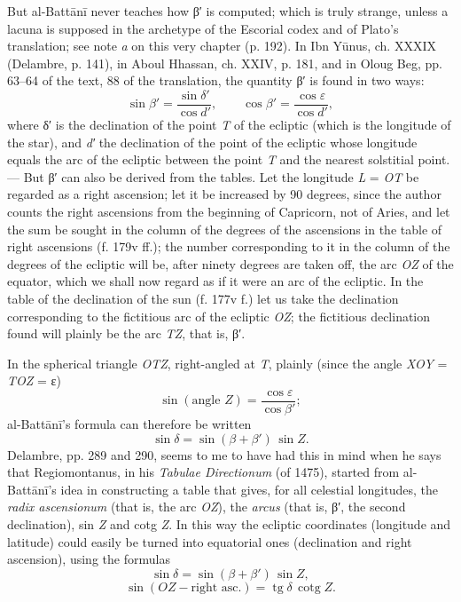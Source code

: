 \documentclass[11pt]{article}
\begin{document}
\par But al-Battānī never teaches how {\greekfont β}′ is computed; which is truly strange, unless a lacuna is supposed in the archetype of the Escorial codex and of Plato's translation; see note \emph{a} on this very chapter (p. 192). In Ibn Yūnus, ch. XXXIX (Delambre, p. 141), in Aboul Hhassan, ch. XXIV, p. 181, and in Oloug Beg, pp. 63–64 of the text, 88 of the translation, the quantity {\greekfont β}′ is found in two ways: \[ \sin\beta' = \frac{\sin\delta'}{\cos d'}, \qquad \cos\beta' = \frac{\cos\varepsilon}{\cos d'}, \] where {\greekfont δ}′ is the declination of the point \emph{T} of the ecliptic (which is the longitude of the star), and \emph{d′} the declination of the point of the ecliptic whose longitude equals the arc of the ecliptic between the point \emph{T} and the nearest solstitial point. — But {\greekfont β}′ can also be derived from the tables. Let the longitude \emph{L} = \emph{OT} be regarded as a right ascension; let it be increased by 90 degrees, since the author counts the right ascensions from the beginning of Capricorn, not of Aries, and let the sum be sought in the column of the degrees of the ascensions in the table of right ascensions (f. 179v ff.); the number corresponding to it in the column of the degrees of the ecliptic will be, after ninety degrees are taken off, the arc \emph{OZ} of the equator, which we shall now regard as if it were an arc of the ecliptic. In the table of the declination of the sun (f. 177v f.) let us take the declination corresponding to the fictitious arc of the ecliptic \emph{OZ}; the fictitious declination found will plainly be the arc \emph{TZ}, that is, {\greekfont β}′.\par
\par In the spherical triangle \emph{OTZ}, right-angled at \emph{T}, plainly (since the angle \emph{XOY} = \emph{TOZ} = {\greekfont ε}) \[ \sin(\text{angle } Z) = \frac{\cos\varepsilon}{\cos\beta'}; \] al-Battānī's formula can therefore be written \[ \sin\delta = \sin(\beta + \beta')\,\sin Z. \] Delambre, pp. 289 and 290, seems to me to have had this in mind when he says that Regiomontanus, in his \emph{Tabulae Directionum} (of 1475), started from al-Battānī's idea in constructing a table that gives, for all celestial longitudes, the \emph{radix ascensionum} (that is, the arc \emph{OZ}), the \emph{arcus} (that is, {\greekfont β}′, the second declination), sin \emph{Z} and cotg \emph{Z}. In this way the ecliptic coordinates (longitude and latitude) could easily be turned into equatorial ones (declination and right ascension), using the formulas \[ \sin\delta = \sin(\beta + \beta')\,\sin Z, \] \[ \sin(OZ - \text{right asc.}) = \operatorname{tg}\delta\,\operatorname{cotg} Z. \]\par
\end{document}
